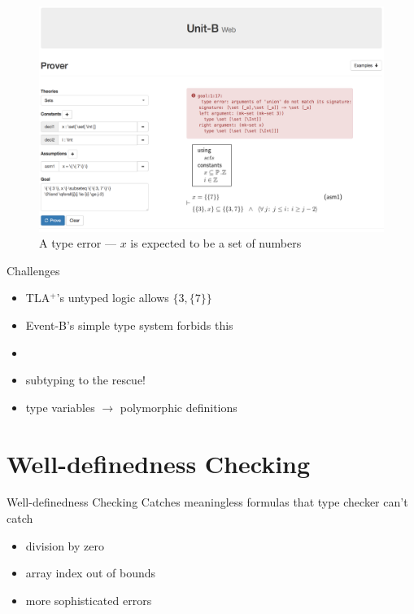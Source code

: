 \documentclass[11pt]{beamer}
\newcommand{\eventb}{Event-B\xspace}
\newcommand{\tla}{TLA${}^+$\xspace}
\begin{document}
\begin{frame}[plain]
  \begin{figure}
    \centering
    \includegraphics[width=\textwidth]{img/unitb_typechecking.png}
    \caption{A type error --- $x$ is expected to be a set of
      numbers}\label{fig:typechecking}
  \end{figure}
\end{frame}


\begin{frame}[fragile]{Challenges}
  \begin{itemize}[<+->]
  \item \tla's untyped logic allows $\{3, \{7\}\}$
  \item \eventb's simple type system forbids this
  \item {}
  \item \alert{subtyping} to the rescue!
  \item type variables $\rightarrow$ polymorphic definitions
  \end{itemize}
\end{frame}


\section{Well-definedness Checking}

\begin{frame}[fragile]{Well-definedness Checking}
  Catches meaningless formulas that type checker can't catch
  \begin{itemize}
  \item <2-> division by zero
  \item <3-> array index out of bounds
  \item <4-> more sophisticated errors
  \end{itemize}
\end{frame}
\end{document}
